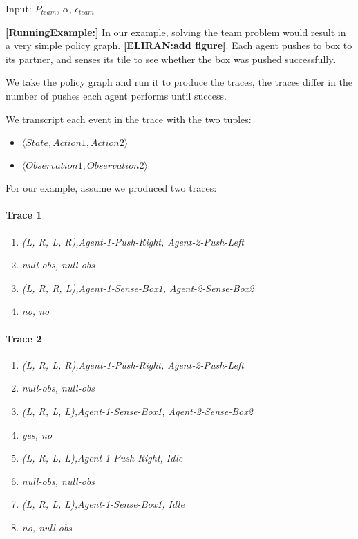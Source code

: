 \documentclass[letterpaper]{article} %
\newcommand{\eliran}[1]{\textbf{[\color{red}ELIRAN:#1]}}
\newcommand{\RE}[1]{\textbf{[\color{purple}RunningExample:#1]}}
\begin{document}
\begin{algorithm}
\caption{ProduceTraces \eliran{keep this?}}
\begin{algorithmic}[tbph]
\State Input: $P_{team}$, $\alpha$, $\epsilon_{team}$
\end{algorithmic}
\end{algorithm}

\RE{}
In our example, solving the team problem would result in a very simple policy graph. \eliran{add figure}.
Each agent pushes to box to its partner, and senses its tile to see whether the box was pushed successfully.

We take the policy graph and run it to produce the traces, the traces differ in the number of pushes each agent performs until success.

We transcript each event in the trace with the two tuples:
\begin{itemize}
 \item $\langle State, Action1, Action2 \rangle$
 \item $\langle Observation1, Observation2 \rangle$
\end{itemize}

For our example, assume we produced two traces:
\paragraph{Trace 1}
\begin{enumerate}
    \item \emph{(L, R, L, R),Agent-1-Push-Right, Agent-2-Push-Left}
    \item \emph{null-obs, null-obs}
    \item \emph{(L, R, R, L),Agent-1-Sense-Box1, Agent-2-Sense-Box2}
    \item \emph{no, no}
\end{enumerate}
\paragraph{Trace 2}
\begin{enumerate}
    \item \emph{(L, R, L, R),Agent-1-Push-Right, Agent-2-Push-Left}
    \item \emph{null-obs, null-obs}
    \item \emph{(L, R, L, L),Agent-1-Sense-Box1, Agent-2-Sense-Box2}
    \item \emph{yes, no}
    \item \emph{(L, R, L, L),Agent-1-Push-Right, Idle}
    \item \emph{null-obs, null-obs}
    \item \emph{(L, R, L, L),Agent-1-Sense-Box1, Idle}
    \item \emph{no, null-obs}
\end{enumerate}
\end{document}
